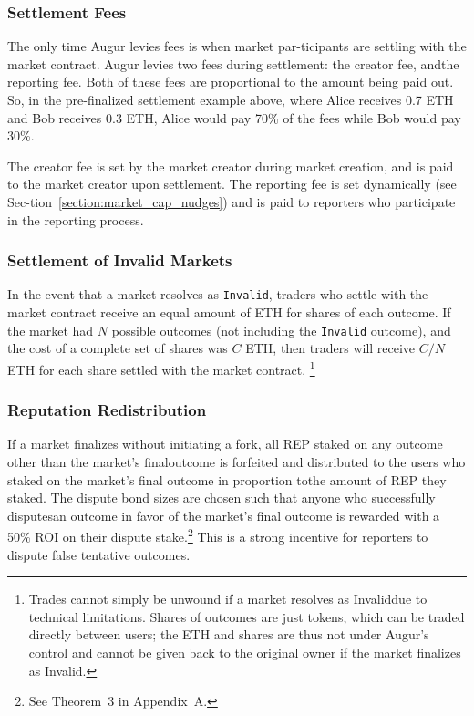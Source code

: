 \documentclass[12pt,floatfix,reprint,nofootinbib,amsmath,amssymb,epsfig,pre,floats,letterpaper,groupedaffiliation]{revtex4-1}
\theoremstyle{definition}
\theoremstyle{definition}
\begin{document}
\subsubsection{Settlement Fees}

The only time Augur levies fees is when market par-\linebreak ticipants are settling with the market contract. Augur levies two fees during settlement: the creator fee, and\linebreak the reporting fee. Both of these fees are proportional to the amount being paid out. So, in the pre-finalized settlement example above, where Alice receives 0.7 ETH and Bob receives 0.3 ETH, Alice would pay 70\% of the fees while Bob would pay 30\%.

The creator fee is set by the market creator during market creation, and is paid to the market creator upon settlement. The reporting fee is set dynamically (see Sec-\linebreak tion~\ref{section:market_cap_nudges}) and is paid to reporters who participate in the reporting process.

\subsubsection{Settlement of Invalid Markets}

In the event that a market resolves as \texttt{Invalid}, traders who settle with the market contract receive an equal amount of ETH for shares of each outcome. If the market had $N$ possible outcomes (not including the \texttt{Invalid} outcome), and the cost of a complete set of shares was $C$ ETH, then traders will receive $C/N$ ETH for each share settled with the market contract.
\footnote{Trades cannot simply be unwound if a market resolves as Invalid\linebreak due to technical limitations. Shares of outcomes are just tokens, which can be traded directly between users; the ETH and shares are thus not under Augur's control and cannot be given back to the original owner if the market finalizes as Invalid.}

\subsubsection{Reputation Redistribution}\label{section:rep_redistribution}

If a market finalizes without initiating a fork, all REP staked on any outcome other than the market's final\linebreak outcome is forfeited and distributed to the users who staked on the market's final outcome in proportion to\linebreak the amount of REP they staked. The dispute bond sizes are chosen such that anyone who successfully disputes\linebreak an outcome in favor of the market's final outcome is rewarded with a 50\% ROI on their dispute stake.\footnote{See Theorem~3 in Appendix~A.} This is a strong incentive for reporters to dispute false tentative outcomes.
\end{document}
